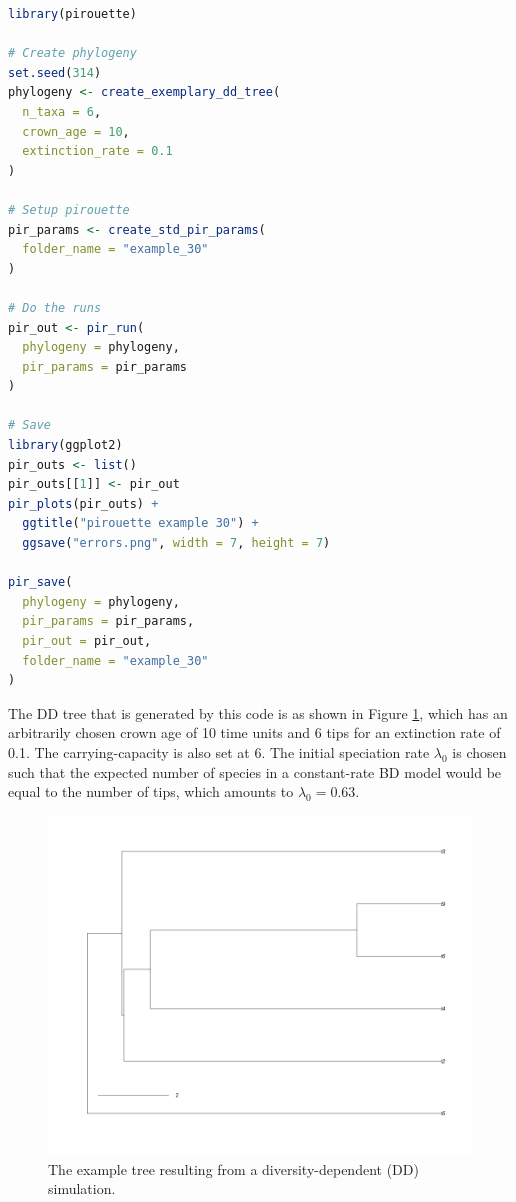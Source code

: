 \begin{lstlisting}[language=R]
library(pirouette)

# Create phylogeny
set.seed(314)
phylogeny <- create_exemplary_dd_tree(
  n_taxa = 6, 
  crown_age = 10,
  extinction_rate = 0.1
)

# Setup pirouette
pir_params <- create_std_pir_params(
  folder_name = "example_30"
)

# Do the runs
pir_out <- pir_run(
  phylogeny = phylogeny,
  pir_params = pir_params
)

# Save
library(ggplot2)
pir_outs <- list()
pir_outs[[1]] <- pir_out
pir_plots(pir_outs) +
  ggtitle("pirouette example 30") +
  ggsave("errors.png", width = 7, height = 7)

pir_save(
  phylogeny = phylogeny,
  pir_params = pir_params,
  pir_out = pir_out,
  folder_name = "example_30"
)
\end{lstlisting}

The DD tree that is generated by this code is as shown in Figure \ref{fig:dd_tree},
which has an arbitrarily chosen crown age of 10 time units and 6 tips for an extinction rate of 0.1. The carrying-capacity is also set at 6. The initial speciation rate $\lambda_0$ is chosen such that the expected number of species in a constant-rate BD model would be equal to the number of tips, which amounts to $\lambda_0 = 0.63$.

\begin{figure}[H]
  \includegraphics[width=\textwidth]{pirouette_example_30/example_30_314/true_tree.png}
  \caption{
    The example tree resulting from a diversity-dependent (DD) simulation.
  }
  \label{fig:dd_tree}
\end{figure}

